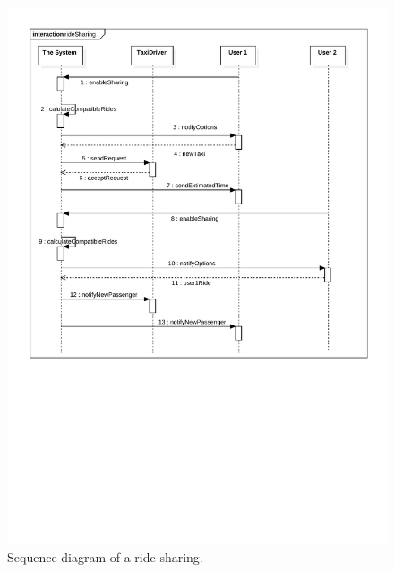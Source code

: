 \begin{figure}
	\includegraphics[width=\textwidth]{diagrams/ride_sharing.pdf}
	\caption{Sequence diagram of a ride sharing.}
	\label{fig:sequence-sharing}
\end{figure}

